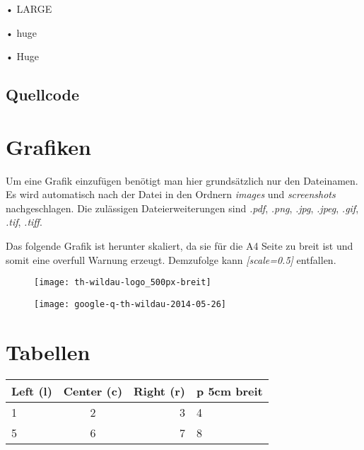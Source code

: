 \begin{LARGE}
• LARGE
\end{LARGE}

\begin{huge}
• huge
\end{huge}

\begin{Huge}
• Huge
\end{Huge}

\subsection{Quellcode}\label{quellcode}


\section{Grafiken}\label{sec:grafiken}

Um eine Grafik einzufügen benötigt man hier grundsätzlich nur den Dateinamen. Es wird automatisch nach der Datei in den Ordnern \textit{images} und \textit{screenshots} nachgeschlagen. Die zulässigen Dateierweiterungen sind \textit{.pdf}, \textit{.png}, \textit{.jpg}, \textit{.jpeg}, \textit{.gif}, \textit{.tif}, \textit{.tiff}.\par

Das folgende Grafik ist herunter skaliert, da sie für die A4 Seite zu breit ist und somit eine overfull Warnung erzeugt. Demzufolge kann \textit{[scale=0.5]} entfallen.\par

\begin{figure}[ht]
	\centering
	\texttt{[image: th-wildau-logo\_500px-breit]}
	\label{fig:thWildau050}
\end{figure}

\begin{figure}[ht]
	\centering
	\texttt{[image: google-q-th-wildau-2014-05-26]}
	\label{fig:googleThWildau}
\end{figure}

\section{Tabellen}\label{sec:tabellen}

\begin{table}[ht]
	\centering
	\label{tab:matrix}
	\begin{tabular}{ | l | c | r | p{5cm} | }
		\hline
		\textbf{Left (l)} & \textbf{Center (c)} & \textbf{Right (r)} & \textbf{p 5cm breit}\\
		\hline
		1 & 2 & 3 & 4\\
		\hline
		5 & 6 & 7 & 8\\
		\hline
	\end{tabular}
\end{table}
